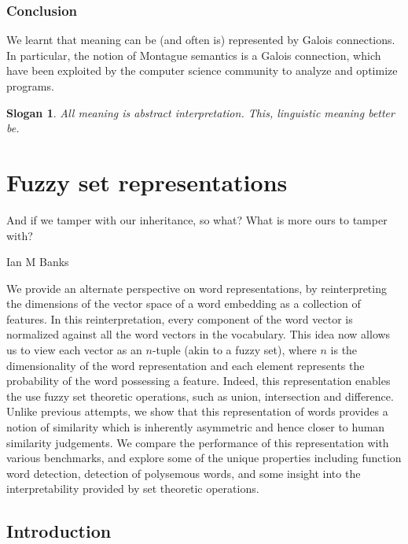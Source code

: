 \documentclass[11pt]{book}
\newtheorem{slogan}{Slogan}
\begin{document}
\subsection{Conclusion}

We learnt that meaning can be (and often is) represented by Galois connections.
In particular, the notion of Montague semantics is a Galois connection, which have been
exploited by the computer science community to analyze and optimize programs.

\begin{slogan}
    All meaning is abstract interpretation. This, linguistic meaning better be.
\end{slogan}




\chapter{Fuzzy set representations}
\label{chapter:fuzzy-set-representation}

\epigraph{And if we tamper with our inheritance, so what? What is more ours to tamper with?}{Ian M Banks}

We provide an alternate perspective on word representations, by
reinterpreting the dimensions of the vector space of a word embedding as a
collection of features. In this reinterpretation, every component of the word
vector is normalized against all the word vectors in the vocabulary. This idea
now allows us to view each vector as an $n$-tuple (akin to a fuzzy set), where
$n$ is the dimensionality of the word representation and each element
represents the probability of the word possessing a feature. Indeed, this
representation enables the use fuzzy set theoretic operations, such as union,
intersection and difference. Unlike previous attempts, we show that this
representation of words provides a notion of similarity which is inherently
asymmetric and hence closer to human similarity judgements. We compare the
performance of this representation with various benchmarks, and explore some of
the unique properties including function word detection, detection of
polysemous words, and some insight into the interpretability provided by set
theoretic operations.

\section{Introduction} \label{sec: intro}
\end{document}
